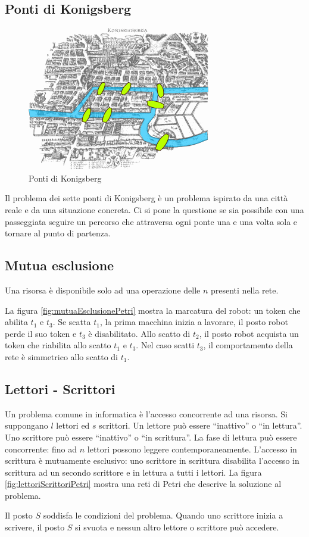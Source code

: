 \documentclass[a4paper]{report}
\begin{document}
\subsection{Ponti di Konigsberg}
\begin{figure}[!h]
  \begin{center}
    \includegraphics[scale=0.5]{./figures/konigsberg_bridges.png}
    \caption{Ponti di Konigsberg}\label{fig:konigsberg_bridges}
  \end{center}
\end{figure} 
Il problema dei sette ponti di Konigsberg \`e un problema ispirato da
una citt\`a reale e da una situazione concreta.
Ci si pone la questione se sia possibile con una passeggiata seguire
un percorso che attraversa ogni ponte una e una volta sola e tornare
al punto di partenza.
  
\subsection{Mutua esclusione}
Una risorsa \`e disponibile solo ad una operazione delle $n$ presenti
nella rete.

La figura \ref{fig:mutuaEsclusionePetri} mostra la marcatura del
robot: un token che abilita $t_1$ e $t_3$. Se scatta $t_1$, la prima
macchina inizia a lavorare, il posto robot perde il suo token e $t_3$
\`e disabilitato. Allo scatto di $t_2$, il posto robot acquista un
token che riabilita allo scatto $t_1$ e $t_3$. Nel caso scatti $t_3$,
il comportamento della rete \`e simmetrico allo scatto di $t_1$.

\subsection{Lettori - Scrittori}
Un problema comune in informatica \`e l'accesso concorrente ad una
risorsa. Si suppongano $l$ lettori ed $s$ scrittori. Un lettore pu\`o
essere ``inattivo'' o ``in lettura''. Uno scrittore pu\`o essere
``inattivo'' o ``in scrittura''. La fase di lettura pu\`o essere
concorrente: fino ad $n$ lettori possono leggere
contemporaneamente. L'accesso in scrittura \`e mutuamente esclusivo:
uno scrittore in scrittura disabilita l'accesso in scrittura ad un
secondo scrittore e in lettura a tutti i lettori.
La figura \ref{fig:lettoriScrittoriPetri} mostra una reti di Petri che
descrive la soluzione al problema.

Il posto $S$ soddisfa le condizioni del problema. Quando uno scrittore
inizia a scrivere, il posto $S$ si svuota e nessun altro
lettore o scrittore pu\`o accedere.
\end{document}
